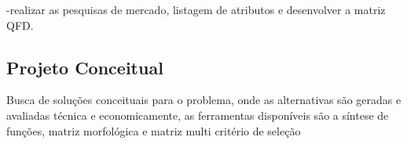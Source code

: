 -realizar as pesquisas de mercado, listagem de atributos e desenvolver a matriz QFD.

\subsection{Projeto Conceitual}

Busca de soluções conceituais para o problema, onde as alternativas são geradas e avaliadas técnica e economicamente, as ferramentas disponíveis são a síntese de funções, matriz morfológica e matriz multi critério de seleção

%
%
%
